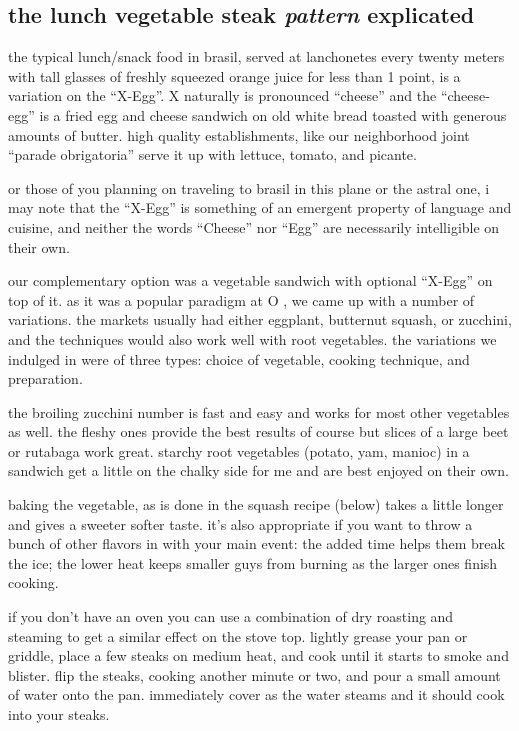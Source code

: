 \subsection{the lunch vegetable steak \textit{pattern} explicated}

the typical lunch/snack food in brasil, served at lanchonetes every
twenty meters with tall glasses of freshly squeezed orange juice for
less than 1 point, is a variation on the ``X-Egg''. X naturally is
pronounced ``cheese'' and the ``cheese-egg'' is a fried egg and cheese
sandwich on old white bread toasted with generous amounts of
butter. high quality establishments, like our neighborhood joint
"`\gls{parade obrigatoria}"' serve it up with lettuce, tomato, and picante.

or those of you planning on traveling to brasil in this plane or the
astral one, i may note that the ``X-Egg'' is something of an emergent
property of language and cuisine, and neither the words ``Cheese'' nor
``Egg'' are necessarily intelligible on their own.

our complementary option was a vegetable sandwich with optional
``X-Egg'' on top of it. as it was a popular paradigm at O , we
came up with a number of variations. the markets usually had either
eggplant, butternut squash, or zucchini, and the techniques would also
work well with root vegetables. the variations we indulged in were of
three types: choice of  vegetable, cooking technique, and
preparation.

the broiling zucchini number is fast and easy and works for most other
vegetables as well. the fleshy ones provide the best results of course
but slices of a large beet or rutabaga work great. starchy root
vegetables (potato, yam, manioc) in a sandwich get a little on the
chalky side for me and are best enjoyed on their own.

baking the vegetable, as is done in the squash recipe (below) takes a
little longer and gives a sweeter softer taste. it's also appropriate
if you want to throw a bunch of other flavors in with your main event:
the added time helps them break the ice; the lower heat keeps smaller
guys from burning as the larger ones finish cooking.

if you don't have an oven you can use a combination of dry roasting
and steaming to get a similar effect on the stove top. lightly grease
your pan or griddle, place a few steaks on medium heat, and cook until
it starts to smoke and blister. flip the steaks, cooking another
minute or two, and pour a small amount of water onto the
pan. immediately cover as the water steams and it should cook into
your steaks.

